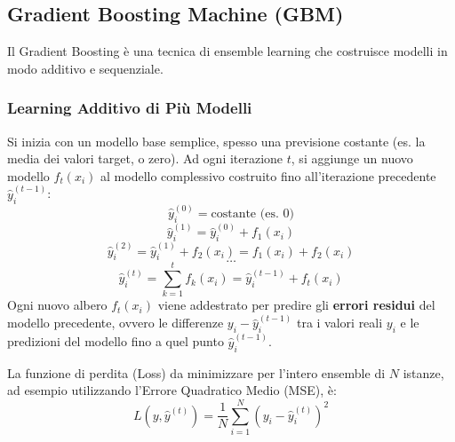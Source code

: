 \documentclass{article}
\begin{document}
\subsection{Gradient Boosting Machine (GBM)}
Il Gradient Boosting è una tecnica di ensemble learning che costruisce modelli in modo additivo e sequenziale.

\subsubsection{Learning Additivo di Più Modelli}
Si inizia con un modello base semplice, spesso una previsione costante (es. la media dei valori target, o zero). Ad ogni iterazione $t$, si aggiunge un nuovo modello $f_t(x_i)$ al modello complessivo costruito fino all'iterazione precedente $\hat{y}_i^{(t-1)}$:
$$ \hat{y}_i^{(0)} = \text{costante (es. 0)} $$
$$ \hat{y}_i^{(1)} = \hat{y}_i^{(0)} + f_1(x_i) $$
$$ \hat{y}_i^{(2)} = \hat{y}_i^{(1)} + f_2(x_i) = f_1(x_i) + f_2(x_i) $$
$$ \dots $$
$$ \hat{y}_i^{(t)} = \sum_{k=1}^{t} f_k(x_i) = \hat{y}_i^{(t-1)} + f_t(x_i) $$
Ogni nuovo albero $f_t(x_i)$ viene addestrato per predire gli \textbf{errori residui} del modello precedente, ovvero le differenze $y_i - \hat{y}_i^{(t-1)}$ tra i valori reali $y_i$ e le predizioni del modello fino a quel punto $\hat{y}_i^{(t-1)}$.

La funzione di perdita (Loss) da minimizzare per l'intero ensemble di $N$ istanze, ad esempio utilizzando l'Errore Quadratico Medio (MSE), è:
$$ L(y, \hat{y}^{(t)}) = \frac{1}{N} \sum_{i=1}^{N} (y_i - \hat{y}_i^{(t)})^2 $$
\end{document}
